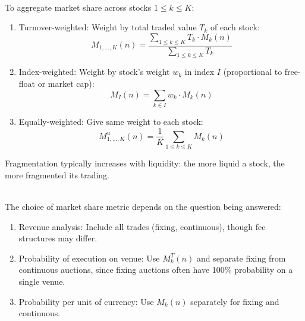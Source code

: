 \begin{definition} \\
To aggregate market share across stocks $1 \leq k \leq K$:
\begin{enumerate}[label=\roman*.]
\setlength{\itemsep}{0pt}
\item Turnover-weighted: Weight by total traded value $T_k$ of each stock:
\begin{equation*}
M_{1,\ldots,K}(n) = \frac{\sum_{1 \leq k \leq K} T_k \cdot M_k(n)}{\sum_{1 \leq k \leq K} T_k}
\end{equation*}
\item Index-weighted: Weight by stock's weight $w_k$ in index $I$ (proportional to free-float or market cap):
\begin{equation*}
M_I(n) = \sum_{k \in I} w_k \cdot M_k(n)
\end{equation*}
\item Equally-weighted: Give same weight to each stock:
\begin{equation*}
M_{1,\ldots,K}^u(n) = \frac{1}{K} \sum_{1 \leq k \leq K} M_k(n)
\end{equation*}
\end{enumerate}
Fragmentation typically increases with liquidity: the more liquid a stock, the more fragmented its trading.
\end{definition}

\begin{remark} \\
The choice of market share metric depends on the question being answered:
\begin{enumerate}[label=\roman*.]
\setlength{\itemsep}{0pt}
\item Revenue analysis: Include all trades (fixing, continuous), though fee structures may differ.
\item Probability of execution on venue: Use $M_k^T(n)$ and separate fixing from continuous auctions, since fixing auctions often have 100\% probability on a single venue.
\item Probability per unit of currency: Use $M_k(n)$ separately for fixing and continuous.
\end{enumerate}
\end{remark}

